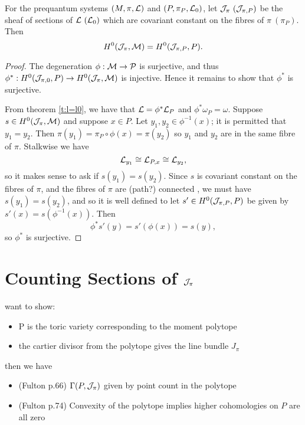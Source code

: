 \begin{theorem}
	For the prequantum systems $(M,\pi,\mathcal{L})$ and $(P,\pi_{P}, \mathcal{L}_0)$, let $\mathcal{J}_\pi ~(\mathcal{J}_{\pi,P})$ be the sheaf of sections of $\mathcal{L} ~(\mathcal{L}_0)$ which are covariant constant on the fibres of $\pi ~(\pi_P)$. Then
	\begin{equation}
	H^0(\mathcal{J}_\pi, \mathcal{M}) = H^0(\mathcal{J}_{\pi,P}, P).
	\end{equation}
\end{theorem}
\begin{proof}
	The degeneration $\phi:\mathcal{M}\to\mathcal{P}$ is surjective, and thus $\phi^\ast:H^0(\mathcal{J}_{\pi,0},P) \to H^0(\mathcal{J}_\pi,\mathcal{M})$ is injective. Hence it remains to show that $\phi^\ast$ is surjective.
	\smallskip
	
	From theorem \ref{t:l=l0}, we have that $\mathcal{L}=\phi^\ast \mathcal{L}_P$ and $\phi^\ast \omega_P = \omega$. Suppose $s\in H^0(\mathcal{J}_{\pi},\mathcal{M})$ and suppose $x \in P$. Let $y_1,y_2 \in \phi^{-1}(x)$; it is permitted that $y_1=y_2$. Then $\pi(y_1) = \pi_P\circ \phi(x) = \pi(y_2)$ so $y_1$ and $y_2$ are in the same fibre of $\pi$. Stalkwise we have
	\begin{equation}
	\mathcal{L}_{y_1} \cong \mathcal{L}_{P,x} \cong \mathcal{L}_{y_2},
	\end{equation} 
	so it makes sense to ask if $s(y_1) = s(y_2)$. Since $s$ is covariant constant on the fibres of $\pi$, and the fibres of $\pi$ are (path?) connected \cite[thm 2.5]{jeffrey_bohr-sommerfeld_1992}, we must have $s(y_1)=s(y_2)$, and so it is well defined to let $s'\in H^0(\mathcal{J}_{\pi,P},P)$ be given by $s'(x) = s\left(\phi^{-1}(x)\right)$. Then
	\begin{equation}
	\phi^\ast s'(y) = s'(\phi(x)) = s(y),
	\end{equation}
	so $\phi^\ast$ is surjective.
\end{proof}


\section{Counting Sections of $\mathcal{J}_\pi$}

	want to show:
	\begin{itemize}
		\item P is the toric variety corresponding to the moment polytope 
		\item the cartier divisor from the polytope gives the line bundle $J_\pi$
	\end{itemize}
	then we have
	\begin{itemize}
		\item (Fulton p.66) $\Gamma(P,\mathcal{J}_\pi)$ given by point count in the polytope
		\item (Fulton p.74) Convexity of the polytope implies higher cohomologies on $P$ are all zero
	\end{itemize}

